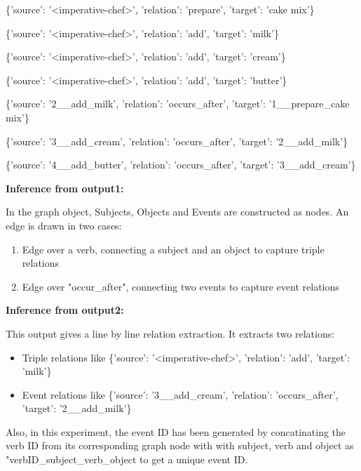 \documentclass[11pt,letterpaper]{article}
\begin{document}
\begin{flushleft}
\{'source': '<imperative-chef>', 'relation': 'prepare', 'target': 'cake mix'\}

\{'source': '<imperative-chef>', 'relation': 'add', 'target': 'milk'\}

\{'source': '<imperative-chef>', 'relation': 'add', 'target': 'cream'\}

\{'source': '<imperative-chef>', 'relation': 'add', 'target': 'butter'\}

\{'source': '2\_<imperative-chef>\_add\_milk', 'relation': 'occurs\_after', 'target': '1\_<imperative-chef>\_prepare\_cake mix'\}

\{'source': '3\_<imperative-chef>\_add\_cream', 'relation': 'occurs\_after', 'target': '2\_<imperative-chef>\_add\_milk'\}

\{'source': '4\_<imperative-chef>\_add\_butter', 'relation': 'occurs\_after', 'target': '3\_<imperative-chef>\_add\_cream'\}

\end{flushleft}
\noindent 
\textbf{Inference from output1:} 

In the graph object, Subjects, Objects and Events are constructed as nodes. An edge is drawn in two cases:
\begin{enumerate}
    \item Edge over a verb, connecting a subject and an object to capture triple relations
    \item Edge over "occur\_after", connecting two events to capture event relations
\end{enumerate}
\noindent 
\textbf{Inference from output2:} 

This output gives a line by line relation extraction. It extracts two relations:

\begin{itemize}
    \item Triple relations like \{'source': '<imperative-chef>', 'relation': 'add', 'target': 'milk'\}
    \item Event relations like \{'source': '3\_<imperative-chef>\_add\_cream', 'relation': 'occurs\_after', 'target': '2\_<imperative-chef>\_add\_milk'\}
    
\end{itemize}
\noindent \newline
Also, in this experiment, the event ID has been generated by concatinating the verb ID from its corresponding graph node with with subject, verb and object as "verbID\_subject\_verb\_object to get a unique event ID.
\end{document}
